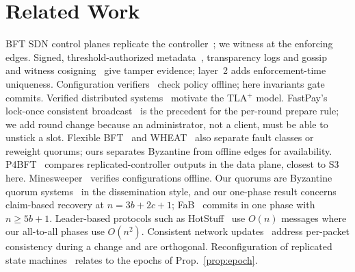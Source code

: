 \documentclass[conference]{IEEEtran}
\begin{document}
\section{Related Work}
BFT SDN control planes replicate the controller~\cite{morph,curb}; we witness at the enforcing edges. Signed, threshold-authorized metadata~\cite{tuf,rpki,tailnetlock}, transparency logs and gossip~\cite{ct,gossip} and witness cosigning~\cite{cosi} give tamper evidence; layer~2 adds enforcement-time uniqueness. Configuration verifiers~\cite{batfish,veriflow,minesweeper} check policy offline; here invariants gate commits. Verified distributed systems~\cite{ironfleet,verdi} motivate the TLA$^+$ model. FastPay's lock-once consistent broadcast~\cite{fastpay} is the precedent for the per-round prepare rule; we add round change because an administrator, not a client, must be able to unstick a slot. Flexible BFT~\cite{flexbft} and WHEAT~\cite{wheat} also separate fault classes or reweight quorums; ours separates Byzantine from offline edges for availability. P4BFT~\cite{p4bft} compares replicated-controller outputs in the data plane, closest to S3 here. Minesweeper~\cite{minesweeper} verifies configurations offline. Our quorums are Byzantine quorum systems~\cite{bqs} in the dissemination style, and our one-phase result concerns claim-based recovery at $n=3b+2c+1$; FaB~\cite{fab} commits in one phase with $n\ge5b+1$. Leader-based protocols such as HotStuff~\cite{hotstuff} use $O(n)$ messages where our all-to-all phases use $O(n^2)$. Consistent network updates~\cite{reitblatt} address per-packet consistency during a change and are orthogonal. Reconfiguration of replicated state machines~\cite{lmz} relates to the epochs of Prop.~\ref{prop:epoch}.
\end{document}
